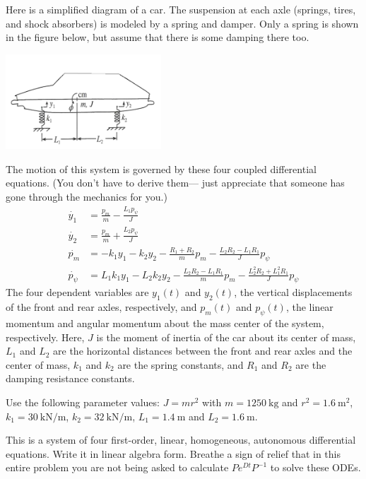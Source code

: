 \documentclass[boxes,printing,blanks,hmc]{gsypset}
\begin{document}
\begin{problem}
	Here is a simplified diagram of a car. 
	The suspension at each axle (springs, tires, and shock absorbers) 
	is modeled by a spring and damper. 
	Only a spring is shown in the figure below, but assume that there is some damping there too.
	\begin{center}
		\includegraphics[keepaspectratio=true,height=1.4in]{img/hw08-car} 
	\end{center}

	The motion of this system is governed by these four coupled differential equations. 
	(You don't have to derive them---
	just appreciate that someone has gone through the mechanics for you.) 
	\begin{align*}
		\dot{y_1}&=\frac{p_m}{m}-\frac{L_1p_\psi}{J} \\
		\dot{y_2}&=\frac{p_m}{m}+\frac{L_2p_\psi}{J} \\
		\dot{p_m}&=-k_1y_1-k_2y_2-\frac{R_1+R_2}{m}p_m-\frac{L_2R_2-L_1R_1}{J}p_{\psi} \\
		\dot{p_\psi}&=L_1k_1y_1-L_2k_2y_2-\frac{L_2R_2-L_1R_1}{m}p_m-\frac{L_2^2R_2+L_1^2R_1}{J}p_{\psi}
	\end{align*}
	The four dependent variables are $y_1(t)$ and $y_2(t)$, 
	the vertical displacements of the front and rear axles, respectively, 
	and $p_m(t)$ and $p_{\psi}(t)$, 
	the linear momentum and angular momentum about the mass center of the system, respectively. 
	Here, $J$ is the moment of inertia of the car about its center of mass, 
	$L_1$ and $L_2$ are the horizontal distances between 
	the front and rear axles and the center of mass, 
	$k_1$ and $k_2$ are the spring constants, and 
	$R_1$ and $R_2$ are the damping resistance constants.
	
	Use the following parameter values: $J=mr^2$ with 
	$m=\SI{1250}{\kg}$ and $r^2=\SI{1.6}{\m^2}$, 
	$k_1=\SI{30}{\kN\per\m}$, $k_2=\SI{32}{\kN\per\m}$, 
	$L_1=\SI{1.4}{\m}$ and $L_2=\SI{1.6}{\m}$.
	\end{problem}\newpage\begin{problem}[5 (continued)]
	\begin{subproblems}
		\subproblem
			This is a system of four first-order, linear, homogeneous, autonomous differential equations. 
			Write it in linear algebra form. 
			Breathe a sign of relief that in this entire problem you 
			are not being asked to calculate $Pe^{Dt}P^{-1}$ to solve these ODEs.
			\begin{solution}
				

\end{solution}
\end{subproblems}
\end{problem}
\end{document}
